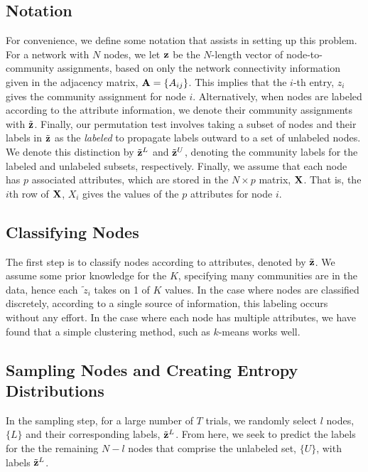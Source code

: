 \subsection{Notation}
For convenience, we define some notation that assists in setting up this problem. For a network with $N$ nodes, we let ${\bf z}$ be the $N$-length vector of node-to-community assignments, based on only the network connectivity information given in the adjacency matrix, ${\bf A}=\{A_{ij}\}$. This implies that the $i$-th entry, $z_{i}$ gives the community assignment for node $i$. Alternatively, when nodes are labeled according to the attribute information, we denote their community assignments with $\tilde{{\bf z}}$.  Finally, our permutation test involves taking a subset of nodes and their labels in $\tilde{{\bf z}}$ as the \emph{labeled} to propagate labels outward to a set of unlabeled nodes. We denote this distinction by $\tilde{{\bf z}}^{L}$ and $\tilde{{\bf z}}^{U}$, denoting the community labels for the labeled and unlabeled subsets, respectively. Finally, we assume that each node has $p$ associated attributes, which are stored in the $N \times p$ matrix, ${\bf X}$. That is, the $i$th row of ${\bf X}$, $X_{i}$ gives the values of the $p$ attributes for node $i$. 

\subsection{Classifying Nodes}
The first step is to classify nodes according to attributes, denoted by $\tilde{{\bf z}}$. We assume some prior knowledge for the $K$, specifying many communities are in the data, hence each $\tilde{{\ z}}_{i}$ takes on 1 of $K$ values. In the case where nodes are classified discretely, according to a single source of information, this labeling occurs without any effort. In the case where each node has multiple attributes, we have found that a simple clustering method, such as $k$-means works well. 

\subsection{Sampling Nodes and Creating Entropy Distributions}
In the sampling step, for a large number of $T$ trials, we randomly select $l$ nodes, $\{L\}$ and their corresponding labels, $\tilde{{\bf z}}^{L}$. From here, we seek to predict the labels for the the remaining $N-l$ nodes that comprise the unlabeled set, $\{U\}$, with labels $\tilde{{\bf z}}^{L}$. 

